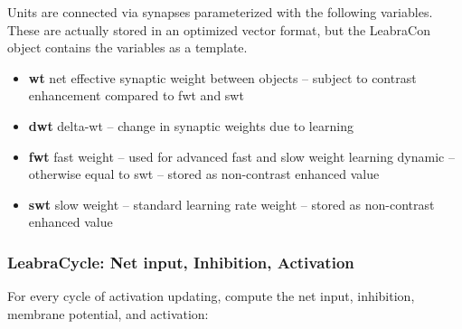 Units are connected via synapses parameterized with the following variables.  These are actually stored in an optimized vector format, but the LeabraCon object contains the variables as a template.
\begin{itemize}
\item {\bf wt} net effective synaptic weight between objects -- subject to contrast enhancement compared to fwt and swt
\item {\bf dwt} delta-wt -- change in synaptic weights due to learning
\item {\bf fwt} fast weight -- used for advanced fast and slow weight learning dynamic -- otherwise equal to swt -- stored as non-contrast enhanced value
\item {\bf swt} slow weight -- standard learning rate weight -- stored as non-contrast enhanced value
\end{itemize}

\subsubsection{LeabraCycle: Net input, Inhibition, Activation}

For every cycle of activation updating, compute the net input, inhibition, membrane potential, and activation:

